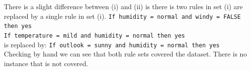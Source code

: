 \documentclass[12pt,twoside]{article}
\begin{document}
\begin{exercises}
\begin{exerciseparts}
\ifsolution \solution{}
There is a slight difference between (i) and (ii) is there is
two rules in set (i) are replaced by a single rule in set (i).
\texttt{If humidity = normal and windy = FALSE then yes} \\
\texttt{If temperature = mild and humidity = normal then yes} \\
is replaced by:
\texttt{If outlook = sunny and humidity = normal then yes} \\

Checking by hand we can see that both rule sets covered the
dataset. There is no instance that is not covered.
\fi
\end{exerciseparts}
\end{exercises}
\end{document}
